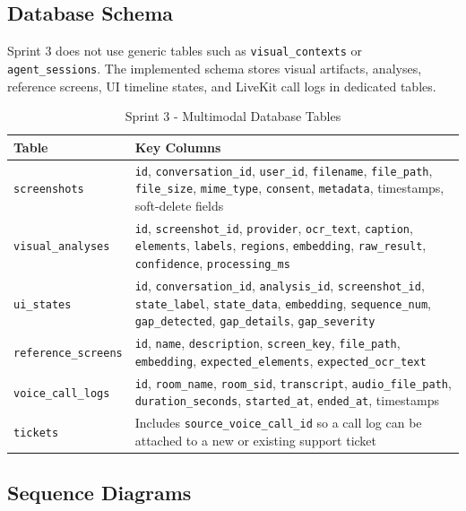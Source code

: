 \subsection{Database Schema}

Sprint 3 does not use generic tables such as \texttt{visual\_contexts} or \texttt{agent\_sessions}. The implemented schema stores visual artifacts, analyses, reference screens, UI timeline states, and LiveKit call logs in dedicated tables.

\begin{table}[H]
\centering
\small
\caption{Sprint 3 - Multimodal Database Tables}
\label{tab:sprint3-db-tables}
\begin{tabular}{|l|p{9.5cm}|}
\hline
\textbf{Table} & \textbf{Key Columns} \\
\hline
\texttt{screenshots} & \texttt{id}, \texttt{conversation\_id}, \texttt{user\_id}, \texttt{filename}, \texttt{file\_path}, \texttt{file\_size}, \texttt{mime\_type}, \texttt{consent}, \texttt{metadata}, timestamps, soft-delete fields \\
\hline
\texttt{visual\_analyses} & \texttt{id}, \texttt{screenshot\_id}, \texttt{provider}, \texttt{ocr\_text}, \texttt{caption}, \texttt{elements}, \texttt{labels}, \texttt{regions}, \texttt{embedding}, \texttt{raw\_result}, \texttt{confidence}, \texttt{processing\_ms} \\
\hline
\texttt{ui\_states} & \texttt{id}, \texttt{conversation\_id}, \texttt{analysis\_id}, \texttt{screenshot\_id}, \texttt{state\_label}, \texttt{state\_data}, \texttt{embedding}, \texttt{sequence\_num}, \texttt{gap\_detected}, \texttt{gap\_details}, \texttt{gap\_severity} \\
\hline
\texttt{reference\_screens} & \texttt{id}, \texttt{name}, \texttt{description}, \texttt{screen\_key}, \texttt{file\_path}, \texttt{embedding}, \texttt{expected\_elements}, \texttt{expected\_ocr\_text} \\
\hline
\texttt{voice\_call\_logs} & \texttt{id}, \texttt{room\_name}, \texttt{room\_sid}, \texttt{transcript}, \texttt{audio\_file\_path}, \texttt{duration\_seconds}, \texttt{started\_at}, \texttt{ended\_at}, timestamps \\
\hline
\texttt{tickets} & Includes \texttt{source\_voice\_call\_id} so a call log can be attached to a new or existing support ticket \\
\hline
\end{tabular}
\end{table}

\subsection{Sequence Diagrams}

